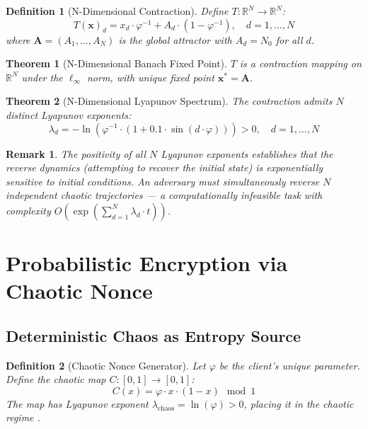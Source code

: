 \documentclass{article}
\newtheorem{theorem}{Theorem}[section]
\newtheorem{definition}{Definition}[section]
\newtheorem{remark}{Remark}[section]
\begin{document}
\begin{definition}[N-Dimensional Contraction]
Define $T: \mathbb{R}^N \to \mathbb{R}^N$:
\begin{equation}
T(\mathbf{x})_d = x_d \cdot \varphi^{-1} + A_d \cdot (1 - \varphi^{-1}), \quad d = 1, \ldots, N
\end{equation}
where $\mathbf{A} = (A_1, \ldots, A_N)$ is the global attractor with $A_d = N_0$ for all $d$.
\end{definition}

\begin{theorem}[N-Dimensional Banach Fixed Point]
$T$ is a contraction mapping on $\mathbb{R}^N$ under the $\ell_\infty$ norm, with unique fixed point $\mathbf{x}^* = \mathbf{A}$.
\end{theorem}

\begin{theorem}[N-Dimensional Lyapunov Spectrum]
The contraction admits $N$ distinct Lyapunov exponents:
\begin{equation}
\lambda_d = -\ln\left(\varphi^{-1} \cdot (1 + 0.1 \cdot \sin(d \cdot \varphi))\right) > 0, \quad d = 1, \ldots, N
\end{equation}
\end{theorem}

\begin{remark}
The positivity of all $N$ Lyapunov exponents establishes that the reverse dynamics (attempting to recover the initial state) is exponentially sensitive to initial conditions. An adversary must simultaneously reverse $N$ independent chaotic trajectories — a computationally infeasible task with complexity $O(\exp(\sum_{d=1}^{N} \lambda_d \cdot t))$.
\end{remark}

\section{Probabilistic Encryption via Chaotic Nonce}

\subsection{Deterministic Chaos as Entropy Source}

\begin{definition}[Chaotic Nonce Generator]
Let $\varphi$ be the client's unique parameter. Define the chaotic map $C: [0,1] \to [0,1]$:
\begin{equation}
C(x) = \varphi \cdot x \cdot (1 - x) \mod 1
\end{equation}
The map has Lyapunov exponent $\lambda_{\text{chaos}} = \ln(\varphi) > 0$, placing it in the chaotic regime \cite{strogatz2018}.
\end{definition}
\end{document}
